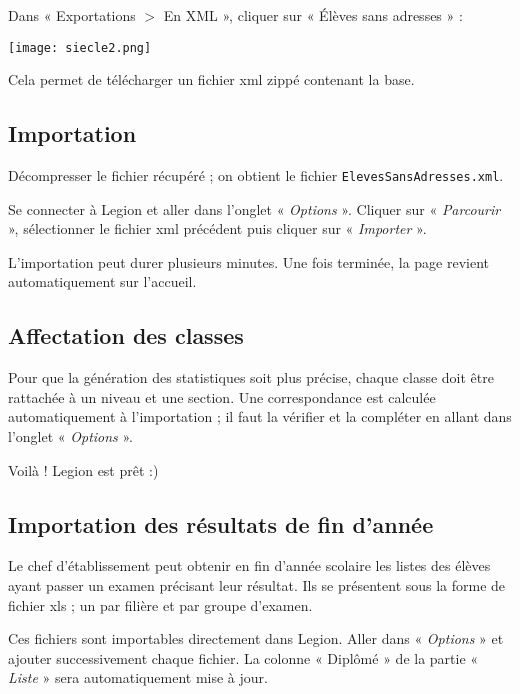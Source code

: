 \documentclass[11pt,a4paper]{article}
\newcommand{\bouton}[1]{« \textit{#1} »}
\begin{document}
Dans « Exportations $>$ En XML », cliquer sur « Élèves sans adresses » :

\texttt{[image: siecle2.png]}

Cela permet de télécharger un fichier xml zippé contenant la base.

\subsection{Importation}
Décompresser le fichier récupéré ; on obtient le fichier \texttt{ElevesSansAdresses.xml}.

Se connecter à Legion et aller dans l'onglet \bouton{Options}. Cliquer sur \bouton{Parcourir}, sélectionner le fichier xml précédent puis cliquer sur \bouton{Importer}.

L'importation peut durer plusieurs minutes. Une fois terminée, la page revient automatiquement sur l'accueil.

\subsection{Affectation des classes}
Pour que la génération des statistiques soit plus précise, chaque classe doit être rattachée à un niveau et une section. Une correspondance est calculée automatiquement à l'importation ; il faut la vérifier et la compléter en allant dans l'onglet \bouton{Options}.

Voilà ! Legion est prêt :)

\subsection{Importation des résultats de fin d'année}
Le chef d'établissement peut obtenir en fin d'année scolaire les listes des élèves ayant passer un examen précisant leur résultat. Ils se présentent sous la forme de fichier xls ; un par filière et par groupe d'examen.

Ces fichiers sont importables directement dans Legion. Aller dans \bouton{Options} et ajouter successivement chaque fichier. La colonne « Diplômé » de la partie \bouton{Liste} sera automatiquement mise à jour.
\end{document}
